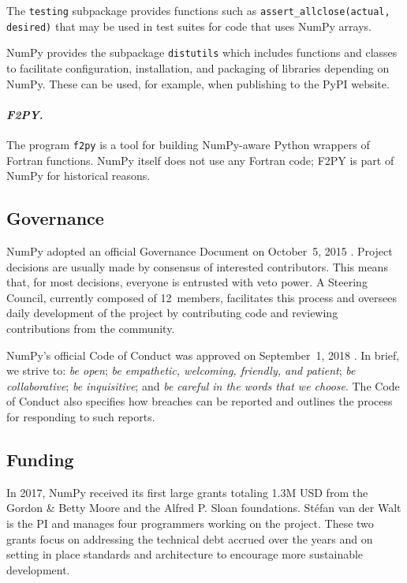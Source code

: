 The \texttt{testing} subpackage provides functions such as
\texttt{assert\_allclose(actual, desired)} that may be used in
test suites for code that uses NumPy arrays.

NumPy provides the subpackage \texttt{distutils} which includes functions and classes
to facilitate configuration, installation, and packaging of libraries depending on NumPy.
These can be used, for example, when publishing to the PyPI website.

\paragraph{\emph{F2PY.}}  The program \texttt{f2py} is a tool for
building NumPy-aware Python wrappers of Fortran functions.
NumPy itself does not use any Fortran code;  F2PY is part of NumPy
for historical reasons.


\subsection*{Governance}

NumPy adopted an official Governance Document on October~5,
2015 \cite{NumPyProjectGovernance}.
Project decisions are usually made by consensus of interested contributors.
This means that, for most decisions, everyone is entrusted with veto power.
A Steering Council, currently composed of 12~members, facilitates this
process and oversees daily development of the project by contributing code
and reviewing contributions from the community.

NumPy's official Code of Conduct was approved on September~1, 2018 \cite{NumPyCodeofConduct}.
In brief, we strive to:
\emph{be open};
\emph{be empathetic, welcoming, friendly, and patient};
\emph{be collaborative};
\emph{be inquisitive}; and
\emph{be careful in the words that we choose}.
The Code of Conduct also specifies how breaches can be reported and outlines
the process for responding to such reports.

\subsection*{Funding}

In 2017, NumPy received its first large grants totaling 1.3M USD from the
Gordon \& Betty Moore and the Alfred P. Sloan foundations.
Stéfan van der Walt is the PI and manages four programmers working on the project.
These two grants focus on addressing the technical debt accrued over the years and
on setting in place standards and architecture to encourage more sustainable development.

